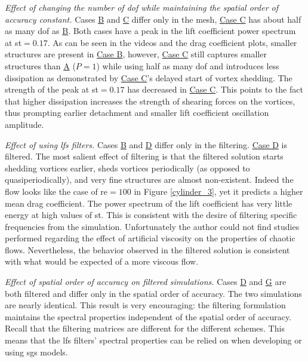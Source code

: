 \emph{Effect of changing the number of \gls{dof} while maintaining the spatial order of accuracy constant.} Cases \hyperlink{caseB}{B} and \hyperlink{caseC}{C} differ only in the mesh, \hyperlink{caseC}{Case C} has about half as many \gls{dof} as \hyperlink{caseB}{B}. Both cases have a peak in the lift coefficient power spectrum at \gls{st}$=0.17$. As can be seen in the videos and the drag coefficient plots, smaller structures are present in \hyperlink{caseB}{Case B}, however, \hyperlink{caseC}{Case C} still captures smaller structures than \hyperlink{caseA}{A} ($P=1$) while using half as many \gls{dof} and introduces less dissipation as demonstrated by \hyperlink{caseC}{Case C}'s delayed start of vortex shedding. The strength of the peak at \gls{st}$=0.17$ has decreased in \hyperlink{caseC}{Case C}. This points to the fact that higher dissipation increases the strength of shearing forces on the vortices, thus prompting earlier detachment and smaller lift coefficient oscillation amplitude.

\emph{Effect of using \gls{lfs} filters.}  Cases \hyperlink{caseB}{B} and \hyperlink{caseD}{D} differ only in the filtering. \hyperlink{caseD}{Case D} is filtered. The most salient effect of filtering is that the filtered solution starts shedding vortices earlier, sheds vortices periodically (as opposed to quasiperiodically), and very fine structures are almost non-existent. Indeed the flow looks like the case of \gls{re}$=100$ in Figure \ref{cylinder_3}, yet it predicts a higher mean drag coefficient. The power spectrum of the lift coefficient has very little energy at high values of \gls{st}. This is consistent with the desire of filtering specific frequencies from the simulation. Unfortunately the author could not find studies performed regarding the effect of artificial viscosity on the properties of chaotic flows. Nevertheless, the behavior observed in the filtered solution is consistent with what would be expected of a more viscous flow.

\emph{Effect of spatial order of accuracy on filtered simulations.} Cases \hyperlink{caseD}{D} and \hyperlink{caseG}{G} are both filtered and differ only in the spatial order of accuracy. The two simulations are nearly identical. This result is very encouraging: the filtering formulation maintains the spectral properties independent of the spatial order of accuracy. Recall that the filtering matrices are different for the different schemes. This means that the \gls{lfs} filters' spectral properties can be relied on when developing or using \gls{sgs} models.


